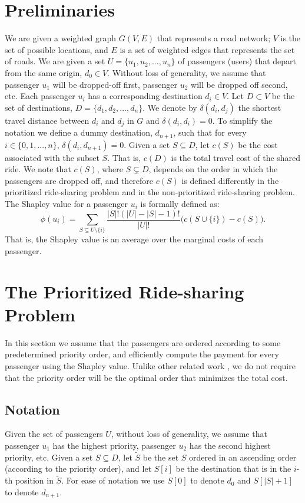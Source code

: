 \documentclass[sigconf]{aamas}
\begin{document}
\section{Preliminaries}
We are given a weighted graph $G(V,E)$ that represents a road network; $V$ is the set of possible locations, and $E$ is a set of weighted edges that represents the set of roads. 
We are given a set $U = \{u_1, u_2, ..., u_n\}$ of passengers (users) that depart from the same origin, $d_0 \in V$. Without loss of generality, we assume that passenger $u_1$ will be dropped-off first, passenger $u_2$ will be dropped off second, etc. Each passenger $u_i$ has a corresponding destination $d_i \in V$. Let $D \subset V$ be the set of destinations, $D = \{d_1, d_2, ..., d_n\}$. 
We denote by $\delta(d_i,d_j)$ the shortest travel distance between $d_i$ and $d_j$ in $G$ and $\delta(d_i,d_i)=0$.
To simplify the notation we define a dummy destination, $d_{n+1}$, such that for every $i \in \{0,1,...,n\}$, $\delta(d_i,d_{n+1})=0$.
Given a set $S \subseteq D$, let $c(S)$ be the cost associated with the subset $S$. That is, $c(D)$ is the total travel cost of the shared ride. We note that $c(S)$, where $S \subsetneq D$, depends on the order in which the passengers are dropped off, and therefore $c(S)$ is defined differently in the prioritized ride-sharing problem and in the non-prioritized ride-sharing problem. The Shapley value for a passenger $u_i$ is formally defined as:
\[
\phi(u_i)=\sum_{S \subseteq U \setminus \{i\}} \frac{|S|!(|U|-|S|-1)!}{|U|!} \big(c(S \cup \{i\}) - c(S)\big).
\]
That is, the Shapley value is an average over the marginal costs of each passenger. 

\section{The Prioritized Ride-sharing Problem}
\label{sec:shapley}
In this section we assume that the passengers are ordered according to some predetermined priority order, and efficiently compute the payment for every passenger using the Shapley value. 
Unlike other related work \cite{potters1992traveling}, we do not require that the priority order will be the optimal order that minimizes the total cost.


\subsection{Notation}
Given the set of passengers $U$, without loss of generality, we assume that passenger $u_1$ has the highest priority, passenger $u_2$ has the second highest priority, etc. 
%
%
%
Given a set $S \subseteq D$, let $\tilde{S}$ be the set $S$ ordered in an ascending order (according to the priority order), and let $S[i]$ be the destination that is in the $i$-th position in $\tilde{S}$. For ease of notation we use $S[0]$ to denote $d_0$ and $S[|S|+1]$ to denote $d_{n+1}$.
\end{document}
